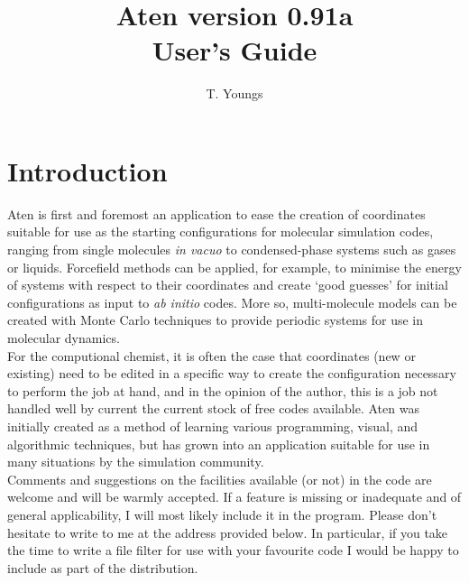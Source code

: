 \documentclass[a4paper,10pt]{report}
\begin{document}
\newenvironment{optlist}[1]
  {
    \begin{flushleft}\textbf{#1}\end{flushleft}
    \begin{list}{}{}
  }
  { \end{list} }

\newcommand{\progname}{{\sffamily Aten}}
\newcommand{\qte}[1]{\lq{}#1\rq{}}
\newcommand{\ttqte}[1]{\lq{}{\ttfamily#1}\rq{}}
\newcommand{\dqte}[1]{``#1''}
\newcommand{\its}{\hspace{20cm}}

\title{\progname{} version 0.91a \\ User's Guide}
\author{T. Youngs}
\maketitle

\tableofcontents

\clearpage

\section{Introduction}

\progname{} is first and foremost an application to ease the creation of coordinates suitable for use as the starting configurations for molecular simulation codes, ranging from single molecules \textit{in vacuo} to condensed-phase systems such as gases or liquids. Forcefield methods can be applied, for example, to minimise the energy of systems with respect to their coordinates and create \qte{good guesses} for initial configurations as input to \textit{ab initio} codes. More so, multi-molecule models can be created with Monte Carlo techniques to provide periodic systems for use in molecular dynamics.\\

For the computional chemist, it is often the case that coordinates (new or existing) need to be edited in a specific way to create the configuration necessary to perform the job at hand, and in the opinion of the author, this is a job not handled well by current the current stock of free codes available. \progname{} was initially created as a method of learning various programming, visual, and algorithmic techniques, but has grown into an application suitable for use in many situations by the simulation community.\\

Comments and suggestions on the facilities available (or not) in the code are welcome and will be warmly accepted. If a feature is missing or inadequate and of general applicability, I will most likely include it in the program. Please don't hesitate to write to me at the address provided below. In particular, if you take the time to write a file filter for use with your favourite code I would be happy to include as part of the distribution.\\
\end{document}
